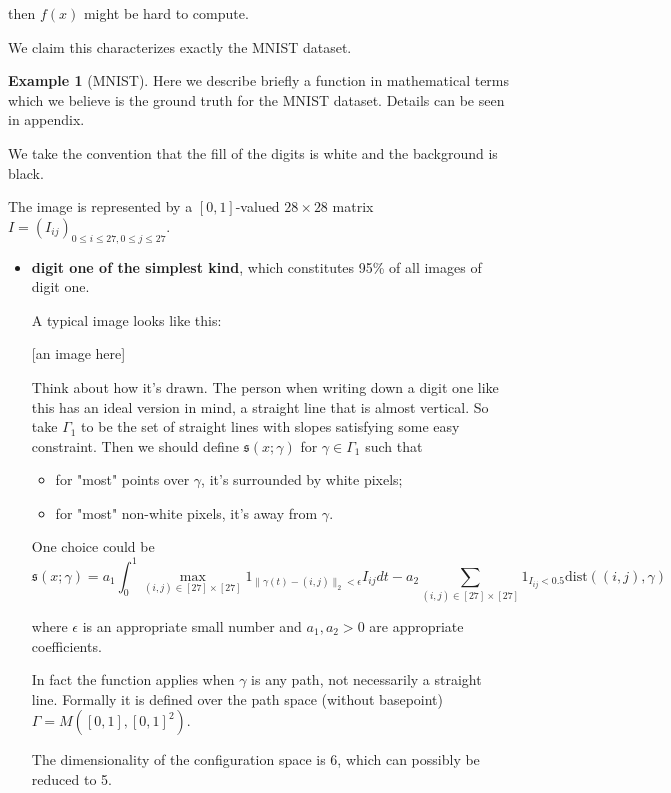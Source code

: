 \documentclass[11pt]{article} 	%
\theoremstyle{definition}
\newtheorem*{example}{Example}
\begin{document}
 then $f(x)$ might be hard to compute.

 We claim this characterizes exactly the MNIST dataset.

\begin{example}[MNIST] Here we describe briefly a function in mathematical terms which we believe is the ground truth for the MNIST dataset. Details can be seen in appendix.

We take the convention that the fill of the digits is white and the background is black.

The image is represented by a $[0,1]$-valued $28\times 28$ matrix $I=(I_{ij})_{0\le i\le 27, 0\le j\le 27}$.

\begin{itemize}
	\item \textbf{digit one of the simplest kind}, which constitutes 95\% of all images of digit one.

A typical image looks like this:

[an image here]

Think about how it's drawn. The person when writing down a digit one like this has an ideal version in mind, a straight line that is almost vertical. So take $\Gamma_1$ to be the set of straight lines with slopes satisfying some easy constraint. Then we should define $\mathfrak{s}(x;\gamma)$ for $\gamma\in \Gamma_1$ such that
\begin{itemize}
	\item for "most" points over $\gamma$, it's surrounded by white pixels;
	\item for "most" non-white pixels, it's away from $\gamma$.
\end{itemize}

One choice could be
\begin{equation}
	\mathfrak{s}(x; \gamma)=a_1\int_{0}^1  \max_{(i,j)\in [27]\times[27]}1_{\|\gamma(t) - (i,j)\|_2 < \epsilon} I_{ij}dt
	-
	a_2\sum_{(i,j)\in [27]\times[27]} 1_{I_{ij}< 0.5}\text{dist}((i,j), \gamma)
\end{equation}

where $\epsilon$ is an appropriate small number and $a_1,a_2>0$ are appropriate coefficients.

In fact the function applies when $\gamma$ is any path, not necessarily a straight line. Formally it is defined over the path space (without basepoint) $\Gamma= M([0,1], [0,1]^2)$.

The dimensionality of the configuration space is 6, which can possibly be reduced to 5.


\end{itemize}
\end{example}
\end{document}
